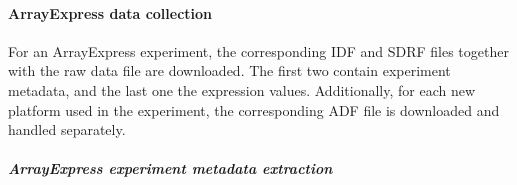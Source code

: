 



\paragraph{ArrayExpress data collection}

%
%

For an ArrayExpress experiment, the corresponding IDF and SDRF files
together with the raw data file are downloaded. The first two contain
experiment metadata, and the last one the expression values.
Additionally, for each new platform used in the experiment, the
corresponding ADF file is downloaded and handled separately.

\subparagraph{ArrayExpress experiment metadata extraction}

